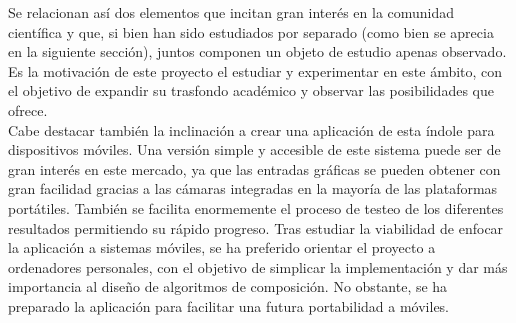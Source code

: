 Se relacionan así dos elementos que incitan gran interés en la comunidad científica y que, si bien han sido estudiados por separado (como bien se aprecia en la siguiente sección), juntos componen un objeto de estudio apenas observado. Es la motivación de este proyecto el estudiar y experimentar en este ámbito, con el objetivo de expandir su trasfondo académico y observar las posibilidades que ofrece.\\

Cabe destacar también la inclinación a crear una aplicación de esta índole para dispositivos móviles. Una versión simple y accesible de este sistema puede ser de gran interés en este mercado, ya que las entradas gráficas se pueden obtener con gran facilidad gracias a las cámaras integradas en la mayoría de las plataformas portátiles. También se facilita enormemente el proceso de testeo de los diferentes resultados permitiendo su rápido progreso. \color{blue}Tras estudiar la viabilidad de enfocar la aplicación a sistemas móviles, se ha preferido orientar el proyecto a ordenadores personales, con el objetivo de simplicar la implementación y dar más importancia al diseño de algoritmos de composición. No obstante, se ha preparado la aplicación para facilitar una futura portabilidad a móviles.\\\color{black}